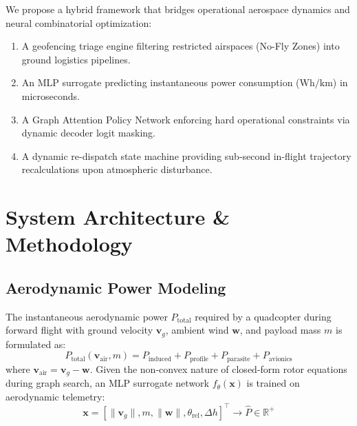 \documentclass[conference]{IEEEtran}
\begin{document}
We propose a hybrid framework that bridges operational aerospace dynamics and neural combinatorial optimization:
\begin{enumerate}
    \item A geofencing triage engine filtering restricted airspaces (No-Fly Zones) into ground logistics pipelines.
    \item An MLP surrogate predicting instantaneous power consumption ($\text{Wh/km}$) in microseconds.
    \item A Graph Attention Policy Network enforcing hard operational constraints via dynamic decoder logit masking.
    \item A dynamic re-dispatch state machine providing sub-second in-flight trajectory recalculations upon atmospheric disturbance.
\end{enumerate}

\section{System Architecture \& Methodology}
\subsection{Aerodynamic Power Modeling}
The instantaneous aerodynamic power $P_{\text{total}}$ required by a quadcopter during forward flight with ground velocity $\mathbf{v}_g$, ambient wind $\mathbf{w}$, and payload mass $m$ is formulated as:
\begin{equation}
P_{\text{total}}(\mathbf{v}_{\text{air}}, m) = P_{\text{induced}} + P_{\text{profile}} + P_{\text{parasite}} + P_{\text{avionics}}
\end{equation}
where $\mathbf{v}_{\text{air}} = \mathbf{v}_g - \mathbf{w}$. Given the non-convex nature of closed-form rotor equations during graph search, an MLP surrogate network $f_\theta(\mathbf{x})$ is trained on aerodynamic telemetry:
\begin{equation}
\mathbf{x} = [\|\mathbf{v}_g\|, m, \|\mathbf{w}\|, \theta_{\text{rel}}, \Delta h]^\top \to \hat{P} \in \mathbb{R}^+
\end{equation}
\end{document}
